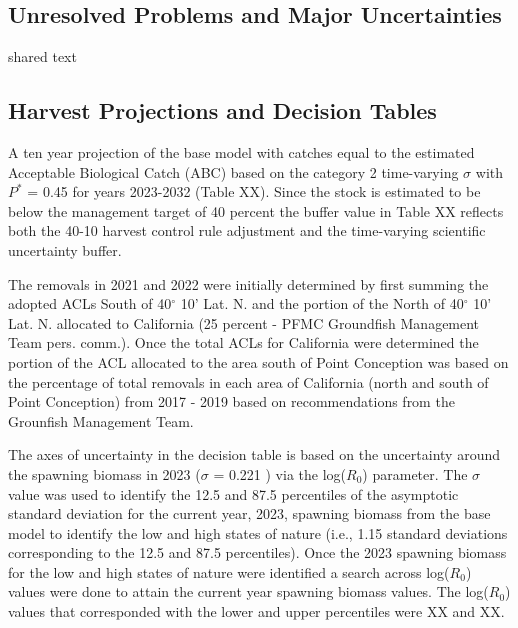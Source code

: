 \documentclass[11pt,
  english,
  letterpaper,
]{article}
\begin{document}
\hypertarget{unresolved-problems-and-major-uncertainties-2}{%
\subsection{Unresolved Problems and Major Uncertainties}\label{unresolved-problems-and-major-uncertainties-2}}

shared text

\hypertarget{harvest-projections-and-decision-tables}{%
\subsection{Harvest Projections and Decision Tables}\label{harvest-projections-and-decision-tables}}

A ten year projection of the base model with catches equal to the estimated Acceptable Biological Catch (ABC) based on the category 2 time-varying \(\sigma\) with \(P^*\) = 0.45 for years 2023-2032 (Table XX). Since the stock is estimated to be below the management target of 40 percent the buffer value in Table XX reflects both the 40-10 harvest control rule adjustment and the time-varying scientific uncertainty buffer.

The removals in 2021 and 2022 were initially determined by first summing the adopted ACLs South of 40\(^\circ\) 10' Lat. N. and the portion of the North of 40\(^\circ\) 10' Lat. N. allocated to California (25 percent - PFMC Groundfish Management Team pers. comm.). Once the total ACLs for California were determined the portion of the ACL allocated to the area south of Point Conception was based on the percentage of total removals in each area of California (north and south of Point Conception) from 2017 - 2019 based on recommendations from the Grounfish Management Team.

The axes of uncertainty in the decision table is based on the uncertainty around the spawning biomass in 2023 (\(\sigma\) = 0.221 ) via the log(\(R_0\)) parameter. The \(\sigma\) value was used to identify the 12.5 and 87.5 percentiles of the asymptotic standard deviation for the current year, 2023, spawning biomass from the base model to identify the low and high states of nature (i.e., 1.15 standard deviations corresponding to the 12.5 and 87.5 percentiles). Once the 2023 spawning biomass for the low and high states of nature were identified a search across log(\(R_0\)) values were done to attain the current year spawning biomass values. The log(\(R_0\)) values that corresponded with the lower and upper percentiles were XX and XX.
\end{document}
